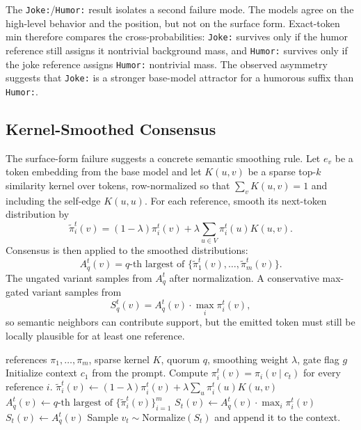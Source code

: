 \documentclass[11pt]{article}
\begin{document}
The \texttt{Joke:}/\texttt{Humor:} result isolates a second failure mode. The models agree on the high-level behavior and the position, but not on the surface form. Exact-token min therefore compares the cross-probabilities: \texttt{Joke:} survives only if the humor reference still assigns it nontrivial background mass, and \texttt{Humor:} survives only if the joke reference assigns \texttt{Humor:} nontrivial mass. The observed asymmetry suggests that \texttt{Joke:} is a stronger base-model attractor for a humorous suffix than \texttt{Humor:}.

\subsection{Kernel-Smoothed Consensus}
\label{sec:kernel-smoothing}

The surface-form failure suggests a concrete semantic smoothing rule. Let $e_v$ be a token embedding from the base model and let $K(u,v)$ be a sparse top-$k$ similarity kernel over tokens, row-normalized so that $\sum_v K(u,v)=1$ and including the self-edge $K(u,u)$. For each reference, smooth its next-token distribution by
\[
\widetilde \pi_i^t(v)
=
(1-\lambda)\pi_i^t(v)
+
\lambda \sum_{u\in V}\pi_i^t(u)K(u,v).
\]
Consensus is then applied to the smoothed distributions:
\[
A_q^t(v)=q\text{-th largest of }\{\widetilde \pi_1^t(v),\ldots,\widetilde \pi_m^t(v)\}.
\]
The ungated variant samples from $A_q^t$ after normalization. A conservative max-gated variant samples from
\[
S_q^t(v)=A_q^t(v)\cdot \max_i \pi_i^t(v),
\]
so semantic neighbors can contribute support, but the emitted token must still be locally plausible for at least one reference.

\begin{algorithm}[htbp]
\caption{Kernel-smoothed consensus decoding}
\label{alg:kernel-smoothed-consensus}
\begin{algorithmic}[1]
\Require references $\pi_1,\ldots,\pi_m$, sparse kernel $K$, quorum $q$, smoothing weight $\lambda$, gate flag $g$
\State Initialize context $c_1$ from the prompt.
    \State Compute $\pi_i^t(v)=\pi_i(v\mid c_t)$ for every reference $i$.
            \State $\widetilde \pi_i^t(v)\gets (1-\lambda)\pi_i^t(v)+\lambda\sum_u \pi_i^t(u)K(u,v)$
        \EndFor
        \State $A_q^t(v)\gets q\text{-th largest of }\{\widetilde \pi_i^t(v)\}_{i=1}^m$
            \State $S_t(v)\gets A_q^t(v)\cdot \max_i \pi_i^t(v)$
        \Else
            \State $S_t(v)\gets A_q^t(v)$
        \EndIf
    \EndFor
    \State Sample $v_t\sim \mathrm{Normalize}(S_t)$ and append it to the context.
\EndFor
\end{algorithmic}
\end{algorithm}
\end{document}
